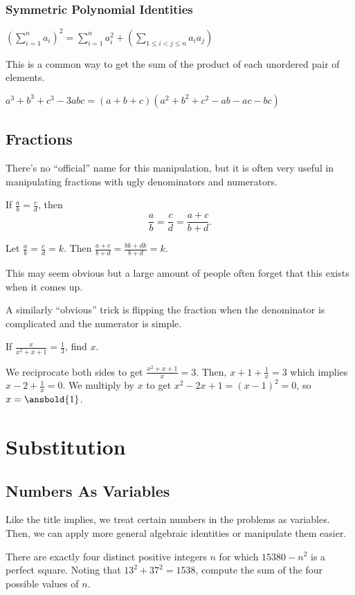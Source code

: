 \documentclass[mast]{lucky}
\begin{document}
\subsubsection{Symmetric Polynomial Identities}

\begin{theo}
$(\sum_{i=1}^{n} a_{i})^2 = \sum_{i=1}^{n} a_{i}^2 + (\sum_{1\leq i < j\leq n } a_{i}a_{j})$
\end{theo}
This is a common way to get the sum of the product of each unordered pair of elements. 
\begin{theo}
$a^3+b^3+c^3-3abc=(a+b+c)(a^2+b^2+c^2-ab-ac-bc)$
\end{theo}

\subsection{Fractions}
There's no ``official'' name for this manipulation, but it is often very useful in manipulating fractions with ugly denominators and numerators. 
\begin{theo}
If $\frac{a}{b}=\frac{c}{d}$, then
\[\frac{a}{b}=\frac{c}{d}=\frac{a+c}{b+d}.\]
\end{theo}

\begin{pro}
Let $\frac{a}{b}=\frac{c}{d}=k$. Then $\frac{a+c}{b+d}=\frac{bk+dk}{b+d}=k$.
\end{pro}

This may seem obvious but a large amount of people often forget that this exists when it comes up.

A similarly ``obvious'' trick is flipping the fraction when the denominator is complicated and the numerator is simple.

\begin{exam}[Classic]
If $\frac{x}{x^2+x+1}=\frac{1}{3}$, find $x$.
\end{exam}

\begin{sol}
We reciprocate both sides to get $\frac{x^2+x+1}{x}=3$. Then, $x+1+\frac{1}{x}=3$ which implies $x-2+\frac{1}{x}=0$. We multiply by $x$ to get $x^2-2x+1=(x-1)^2=0$, so $x=\ansbold{1}$.
\end{sol}
\section{Substitution}

\subsection{Numbers As Variables}
Like the title implies, we treat certain numbers in the problems as variables. Then, we can apply more general algebraic identities or manipulate them easier.
\begin{exam}[SMT 2021/N5]
There are exactly four distinct positive integers $n$ for which $15380 - n^2$ is a perfect square. Noting that $13^2 + 37^2 = 1538$, compute the sum of the four possible values of $n$.
\end{exam}
\end{document}
